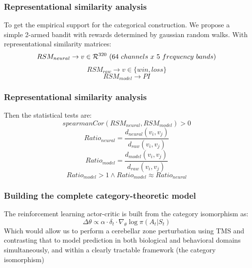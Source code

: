 \documentclass[aspectratio=169]{beamer}
\begin{document}
	\begin{frame}
		\frametitle{Representational similarity analysis}
		To get the empirical support for the categorical construction. We propose a simple 2-armed bandit with rewards determined by gaussian random walks. With representational similarity matrices:
		$$RSM_{neural} \rightarrow v \in \mathcal{R}^{320} \ \text(64 \ channels \ x \ 5 \ frequency \ bands)$$
		$$RSM_{raw} \rightarrow v \in \{win, loss\}$$
		$$RSM_{model} \rightarrow PI$$
	\end{frame}
	
	\begin{frame}
		\frametitle{Representational similarity analysis}
		Then the statistical tests are:
		$$spearmanCor(RSM_{neural}, RSM_{model}) > 0$$
		$$Ratio_{neural} = \frac{d_{neural}(v_{i}, v_{j})}{d_{raw}(v_{i}, v_{j})}$$
		$$Ratio_{model} = \frac{d_{model}(v_{i}, v_{j})}{d_{raw}(v_{i}, v_{j})}$$
		$$Ratio_{model} > 1 \land Ratio_{model} \approx Ratio_{neural}$$
	\end{frame}
	
	\begin{frame}
		\frametitle{Building the complete category-theoretic model}
		The reinforcement learning actor-critic is built from the category isomorphism as:
		$$\Delta \theta \propto \alpha \cdot \delta_{t} \cdot \nabla_{\theta} \log \pi (A_{t}|S_{t})$$
		Which would allow us to perform a cerebellar zone perturbation using TMS and contrasting that to model prediction in both biological and behavioral domains simultaneously, and within a clearly tractable framework (the category isomorphism)
	\end{frame}
	
\end{document}
